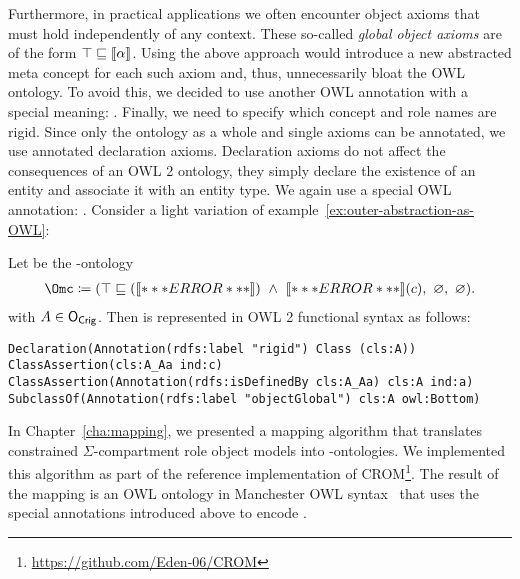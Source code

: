 Furthermore, in practical applications we often encounter object axioms that must hold independently
of any context. These so-called \emph{global object axioms} are of the form
$\top \sqsubseteq \llbracket\alpha\rrbracket$. Using the above approach would introduce a new abstracted meta concept
for each such axiom and, thus, unnecessarily bloat the OWL ontology. To avoid this, we decided to use
another OWL annotation with a special meaning: \rdfsLabelGlobal.
%
Finally, we need to specify which concept and role names are rigid. Since only the ontology as a whole
and single axioms can be annotated, we use annotated declaration axioms. Declaration axioms do not
affect the consequences of an OWL 2 ontology, they simply declare the existence of an entity and
associate it with an entity type. We again use a special OWL annotation: \rdfsLabelRigid.
%
Consider a light variation of example~\ref{ex:outer-abstraction-as-OWL}:

\begin{example}\label{ex:outer-abstraction-as-OWL-w-global}
  Let \Omc be the \ALCALC-ontology
  \begin{align*}
    \Omc \coloneqq (\top\sqsubseteq(\oax{A\sqsubseteq\bot})\ \land\ \oax{A(a)}(c),\ \emptyset,\ \emptyset).
  \end{align*}
  with $A\in\mathsf{O_{Crig}}$. Then \Omc is represented in OWL 2 functional syntax as follows:

\smallskip\noindent
\verb+Declaration(Annotation(rdfs:label "rigid") Class (cls:A))+\\
\verb+ClassAssertion(cls:A_Aa ind:c)+\\
\verb+ClassAssertion(Annotation(rdfs:isDefinedBy cls:A_Aa) cls:A ind:a)+\\
\verb+SubclassOf(Annotation(rdfs:label "objectGlobal") cls:A owl:Bottom)+
\end{example}

In Chapter~\ref{cha:mapping}, we presented a mapping algorithm that translates constrained
$\Sigma$-compartment role object models into \LMLO-ontologies. We implemented this algorithm as part
of the reference implementation of CROM\footnote{\url{https://github.com/Eden-06/CROM}}. The result
of the mapping is an OWL ontology in Manchester OWL syntax~\cite{HoP-OWL2Man12} that uses the
special annotations introduced above to encode \LMLO.

